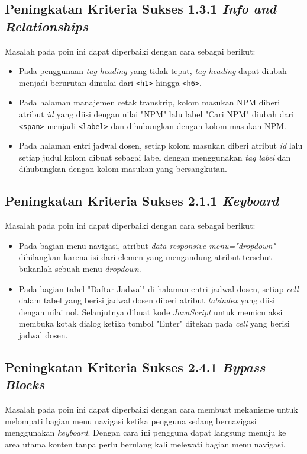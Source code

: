 \subsection{Peningkatan Kriteria Sukses 1.3.1 \textit{Info and Relationships}}
\label{subsec:peningkatan_kriteria_sukses_1.3.1}
Masalah pada poin ini dapat diperbaiki dengan cara sebagai berikut:

\begin{itemize}
    \item Pada penggunaan \textit{tag heading} yang tidak tepat, \textit{tag heading} dapat diubah menjadi berurutan dimulai dari \texttt{<h1>} hingga \texttt{<h6>}.
    \item Pada halaman manajemen cetak transkrip, kolom masukan NPM diberi atribut \textit{id} yang diisi dengan nilai "NPM" lalu label "Cari NPM" diubah dari \texttt{<span>} menjadi \texttt{<label>} dan dihubungkan dengan kolom masukan NPM.
    \item Pada halaman entri jadwal dosen, setiap kolom masukan diberi atribut \textit{id} lalu setiap judul kolom dibuat sebagai label dengan menggunakan \textit{tag label} dan dihubungkan dengan kolom masukan yang bersangkutan.
\end{itemize}

\subsection{Peningkatan Kriteria Sukses 2.1.1 \textit{Keyboard}}
\label{subsec:peningkatan_kriteria_sukses_2.1.1}
Masalah pada poin ini dapat diperbaiki dengan cara sebagai berikut:

\begin{itemize}
    \item Pada bagian menu navigasi, atribut \textit{data-responsive-menu="dropdown"} dihilangkan karena isi dari elemen yang mengandung atribut tersebut bukanlah sebuah menu \textit{dropdown}.
    \item Pada bagian tabel "Daftar Jadwal" di halaman entri jadwal dosen, setiap \textit{cell} dalam tabel yang berisi jadwal dosen diberi atribut \textit{tabindex} yang diisi dengan nilai nol. Selanjutnya dibuat kode \textit{JavaScript} untuk memicu aksi membuka kotak dialog ketika tombol "Enter" ditekan pada \textit{cell} yang berisi jadwal dosen.
\end{itemize}

\subsection{Peningkatan Kriteria Sukses 2.4.1 \textit{Bypass Blocks}}
\label{subsec:peningkatan_kriteria_sukses_2.4.1}
Masalah pada poin ini dapat diperbaiki dengan cara membuat mekanisme untuk melompati bagian menu navigasi ketika pengguna sedang bernavigasi menggunakan \textit{keyboard}. Dengan cara ini pengguna dapat langsung menuju ke area utama konten tanpa perlu berulang kali melewati bagian menu navigasi.

